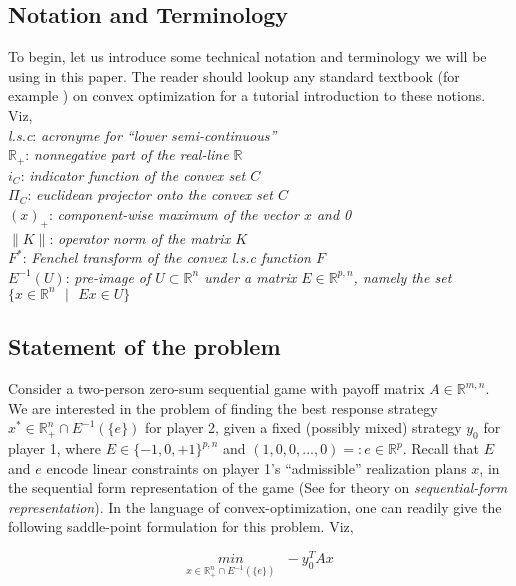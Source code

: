 \documentclass[a4paper,10pt,journal]{IEEEtran}
\begin{document}
\subsection{Notation and Terminology}
To begin, let us introduce some technical notation and terminology we will be using in this paper. The reader should lookup any standard textbook
(for example \cite{boyd2004}) on convex optimization for a tutorial introduction to these notions. Viz,\\
\textit{l.s.c}: \quad \textit{acronyme for ``lower semi-continuous''}\\
$\mathbb{R}_+$: \quad \textit{nonnegative part of the real-line $\mathbb{R}$}\\
$i_C$: \quad \textit{indicator function of the convex set $C$}\\
$\Pi_C$: \quad \textit{euclidean projector onto the convex set $C$}\\
$(x)_+$: \quad \textit{component-wise maximum of the vector $x$ and 0}\\
$\|K\|$: \quad \textit{operator norm of the matrix $K$}\\
$F^*$: \quad \textit{Fenchel transform of the convex l.s.c function $F$}\\
$E^{-1}(U)$: \quad \textit{pre-image of $U \subset \mathbb{R}^n$ under a matrix $E \in \mathbb{R}^{p,n}$,
namely the set $\{x \in \mathbb{R}^n\text{ }| \text{ }Ex \in U\}$}

\subsection{Statement of the problem}
Consider a two-person zero-sum sequential game with payoff matrix $A \in \mathbb{R}^{m,n}$. We are interested in the problem of
finding the best response strategy $x^* \in \mathbb{R}_{+}^n \cap E^{-1}(\{e\})$ for player 2, given a fixed
(possibly mixed) strategy $y_0$ for player 1, where $E \in \{-1, 0, +1\}^{p,n}$ and $(1, 0, 0, ..., 0) =: e \in \mathbb{R}^p$.
Recall that $E$ and $e$ encode linear constraints on player 1's ``admissible'' realization plans $x$, in the sequential form representation
of the game (See \cite{bernhard-1996, benhard-agt} for theory on \textit{sequential-form representation}). In the language of convex-optimization,
one can readily give the following saddle-point formulation for this problem. Viz,

\begin{equation}
  \underset{x \in \mathbb{R}_{+}^n \cap E^{-1}(\{e\})}{min}\text{ }-y_0^TAx
  \label{eq:opt_pb}
\end{equation}
\end{document}

